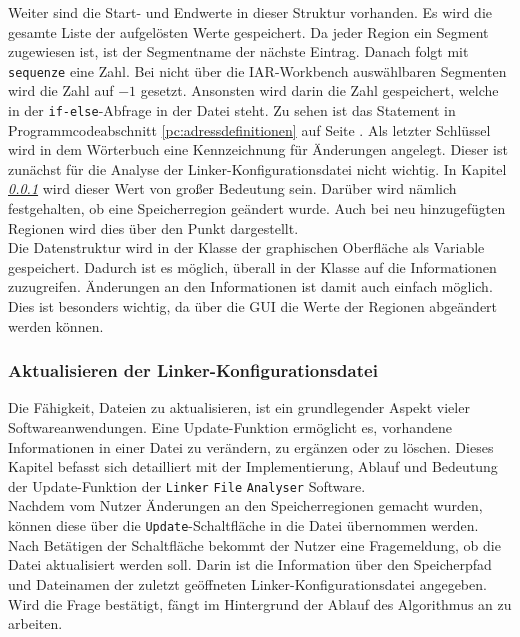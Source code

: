 Weiter sind die Start- und Endwerte in dieser Struktur vorhanden.
Es wird die gesamte Liste der aufgelösten Werte gespeichert.
Da jeder Region ein Segment zugewiesen ist, ist der Segmentname der nächste Eintrag.
Danach folgt mit \verb*|sequenze| eine Zahl.
Bei nicht über die IAR-Workbench auswählbaren Segmenten wird die Zahl auf $-1$ gesetzt.
Ansonsten wird darin die Zahl gespeichert, welche in der \verb*|if-else|-Abfrage in der Datei steht.
Zu sehen ist das Statement in Programmcodeabschnitt \ref{pc:adressdefinitionen} auf Seite \pageref{pc:adressdefinitionen}.
Als letzter Schlüssel wird in dem Wörterbuch eine Kennzeichnung für Änderungen angelegt.
Dieser ist zunächst für die Analyse der Linker-Konfigurationsdatei nicht wichtig.
In Kapitel \textit{\ref{kap:aktualisieren_linker_file} } wird dieser Wert von großer Bedeutung sein.
Darüber wird nämlich festgehalten, ob eine Speicherregion geändert wurde.
Auch bei neu hinzugefügten Regionen wird dies über den Punkt dargestellt. \\

Die Datenstruktur wird in der Klasse der graphischen Oberfläche als Variable gespeichert.
Dadurch ist es möglich, überall in der Klasse auf die Informationen zuzugreifen.
Änderungen an den Informationen ist damit auch einfach möglich.
Dies ist besonders wichtig, da über die \ac{GUI} die Werte der Regionen abgeändert werden können.

\subsubsection{Aktualisieren der Linker-Konfigurationsdatei}\label{kap:aktualisieren_linker_file}
Die Fähigkeit, Dateien zu aktualisieren, ist ein grundlegender Aspekt vieler Softwareanwendungen.
Eine Update-Funktion ermöglicht es, vorhandene Informationen in einer Datei zu verändern, zu ergänzen oder zu löschen.
Dieses Kapitel befasst sich detailliert mit der Implementierung, Ablauf und Bedeutung der Update-Funktion der \verb*|Linker| \verb*|File| \verb*|Analyser| Software. \\

Nachdem vom Nutzer Änderungen an den Speicherregionen gemacht wurden, können diese über die \verb*|Update|-Schaltfläche in die Datei übernommen werden.
Nach Betätigen der Schaltfläche bekommt der Nutzer eine Fragemeldung, ob die Datei aktualisiert werden soll.
Darin ist die Information über den Speicherpfad und Dateinamen der zuletzt geöffneten Linker-Konfigurationsdatei angegeben.
Wird die Frage bestätigt, fängt im Hintergrund der Ablauf des Algorithmus an zu arbeiten. \\

